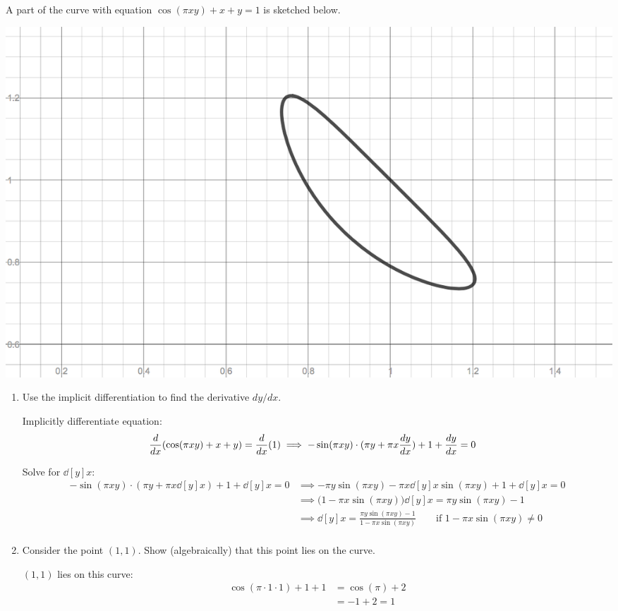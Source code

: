 \documentclass[nooutcomes,handout]{ximera}
\begin{document}
\begin{problem}  A part of the curve with equation $\cos(\pi x y) + x + y = 1$ is sketched below.

  \begin{image}
    \includegraphics[scale = 0.3]{figure4.png}
  \end{image}
  \begin{enumerate}
    \item
      Use the implicit differentiation to find the derivative $dy/dx$.
      \begin{freeResponse}
        Implicitly differentiate equation:
        \begin{align*}
          \ddx( \cos(\pi x y) + x + y) = \ddx(1) &\implies -\sin(\pi x y)\cdot(\pi y + \pi x \dd[y]{x}) + 1 + \dd[y]{x} = 0 
        \end{align*}

        Solve for $\dd[y]{x}$:
        \begin{align*}
          -\sin(\pi x y)\cdot(\pi y + \pi x \dd[y]{x}) + 1 + \dd[y]{x} = 0 &\implies -\pi y \sin(\pi x y) - \pi x \dd[y]{x} \sin(\pi x y) + 1 + \dd[y]{x} = 0 \\
          &\implies  \bigl(1 - \pi x \sin(\pi x y)\bigr)\dd[y]{x} = \pi y \sin(\pi x y) - 1 \\
          &\implies \dd[y]{x} = \frac{\pi y \sin(\pi x y) - 1}{1 - \pi x \sin(\pi x y)} \hspace{2em} \mbox{if $1 - \pi x \sin(\pi x y) \ne 0$}\\
        \end{align*}
      \end{freeResponse}

    \item
      Consider the point $(1, 1)$.
      Show (algebraically) that this point lies on the curve.
      \begin{freeResponse}
        $(1, 1)$ lies on this curve:
        \begin{align*}
          \cos(\pi \cdot 1 \cdot 1) + 1 + 1 &= \cos(\pi) + 2\\
          &= -1 + 2 = 1
        \end{align*}
      \end{freeResponse}


\end{enumerate}
\end{problem}
\end{document}
